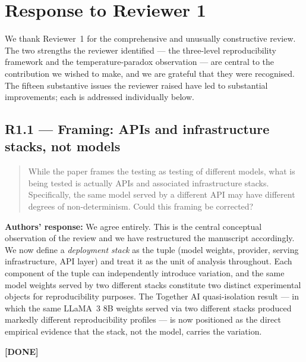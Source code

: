 \documentclass[11pt,a4paper]{article}
\newenvironment{revquote}{%
  \begin{quote}\small\itshape\color{revgray}
}{%
  \end{quote}
}
\newcommand{\response}[1]{\par\noindent\textbf{\color{revgreen}Authors' response:} #1\par}
\newcommand{\done}{\color{revgreen}\textbf{[DONE]}}
\begin{document}
\newpage
\section*{Response to Reviewer 1}

We thank Reviewer~1 for the comprehensive and unusually constructive review. The two strengths the reviewer identified --- the three-level reproducibility framework and the temperature-paradox observation --- are central to the contribution we wished to make, and we are grateful that they were recognised. The fifteen substantive issues the reviewer raised have led to substantial improvements; each is addressed individually below.

\subsection*{R1.1 --- Framing: APIs and infrastructure stacks, not models}

\begin{revquote}
While the paper frames the testing as testing of different models, what is being tested is actually APIs and associated infrastructure stacks. Specifically, the same model served by a different API may have different degrees of non-determinism. Could this framing be corrected?
\end{revquote}

\response{We agree entirely. This is the central conceptual observation of the review and we have restructured the manuscript accordingly. We now define a \emph{deployment stack} as the tuple (model weights, provider, serving infrastructure, API layer) and treat it as the unit of analysis throughout. Each component of the tuple can independently introduce variation, and the same model weights served by two different stacks constitute two distinct experimental objects for reproducibility purposes. The Together AI quasi-isolation result --- in which the same LLaMA~3 8B weights served via two different stacks produced markedly different reproducibility profiles --- is now positioned as the direct empirical evidence that the stack, not the model, carries the variation.} \done
\end{document}
